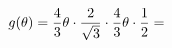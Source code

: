 \documentclass[preview]{standalone}
\begin{document}
\begin{align*}
g( \theta ) = {4 \over 3} \theta \cdot {2 \over \sqrt{3}} \cdot {4 \over 3} \theta \cdot {1 \over 2} =
\end{align*}
\end{document}
